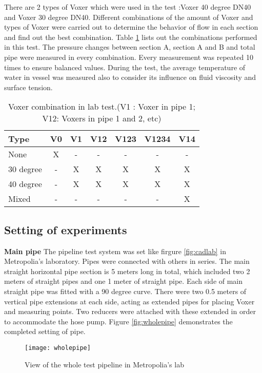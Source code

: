 There are 2 types of Voxer which were used in the test :Voxer 40 degree DN40 and Voxer 30 degree DN40.  Different combinations of the amount of Voxer and types of Voxer were carried out to determine the behavior of flow in each section and find out the best combination. Table \ref{table:combi} lists out the combinations performed in this test. The pressure changes between section A, section A and B and total pipe were measured in every combination. Every measurement was repeated 10 times to ensure balanced values. During the test, the average temperature of water in vessel was measured also to consider its influence on fluid viscosity and surface tension.
\begin{table}[h]
  \centering
  \caption{Voxer combination in lab test.\newline (V1 : Voxer in pipe 1; V12: Voxers in pipe 1 and 2, etc)}
  \begin{tabular}{l*{6}{c}}
Type             & V0 & V1 & V12 & V123 & V1234 & V14 \\
\hline
None & X & - & - & - & - & -   \\
30 degree           & - & X & X & X &  X & X  \\
40 degree           & - & X & X & X &  X & X   \\
Mixed     & - & - & - & - & - & X   \\
\end{tabular}
  \label{table:combi}
\end{table}
\subsection{Setting of experiments}
\textbf{Main pipe} \newline
The pipeline test system was set like firgure \vref{fig:cadlab} in Metropolia’s laboratory.  Pipes were connected with others in series. The main straight horizontal pipe section is 5 meters long in total, which included two 2 meters of straight pipes and one 1 meter of straight pipe. Each side of main straight pipe was fitted with a 90 degree curve. There were two 0.5 meters of vertical pipe extensions at each side, acting as extended pipes for placing Voxer and measuring points. Two reducers were attached with these extended in order to accommodate the hose pump. Figure \vref{fig:wholepipe} demonstrates the completed setting of pipe.
\begin{figure}[h]
  \centering
  \texttt{[image: wholepipe]}
  \caption{View of the whole test pipeline in Metropolia's lab }
  \label{fig:wholepipe}
\end{figure}

